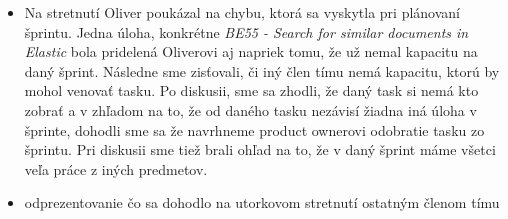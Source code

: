 \documentclass{article}
\begin{document}
    \begin{itemize}
        \item {Na stretnutí Oliver poukázal na chybu, ktorá sa vyskytla pri plánovaní šprintu. Jedna úloha, konkrétne \emph{BE55 - Search for similar documents in Elastic} bola pridelená Oliverovi aj napriek tomu, že už nemal kapacitu na daný šprint.
        Následne sme zisťovali, či iný člen tímu nemá kapacitu, ktorú by mohol venovať tasku. Po diskusii, sme sa zhodli, že daný task si nemá kto zobrať a v zhľadom na to, že od daného tasku nezávisí žiadna iná úloha v šprinte, dohodli sme sa že navrhneme product ownerovi odobratie tasku zo šprintu. 
        Pri diskusii sme tiež brali ohľad na to, že v daný šprint máme všetci veľa práce z iných predmetov.}  
        \item odprezentovanie čo sa dohodlo na utorkovom stretnutí ostatným členom tímu
    \end{itemize}
\end{document}
